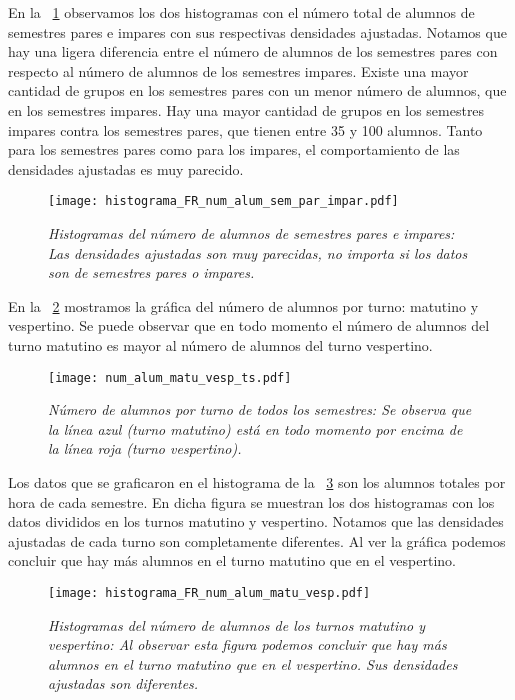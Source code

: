 En la \figurename{~\ref{histNumAlTotal_ParImpar}} observamos los dos histogramas con el número total de alumnos de semestres pares e impares con sus respectivas densidades ajustadas. Notamos que hay una ligera diferencia entre el número de alumnos de los semestres pares con respecto al número de alumnos de los semestres impares. Existe una mayor cantidad de grupos en los semestres pares con un menor número de alumnos, que en los semestres impares. Hay una mayor cantidad de grupos en los semestres impares contra los semestres pares, que tienen entre 35 y 100 alumnos. Tanto para los semestres pares como para los impares, el comportamiento de las densidades ajustadas es muy parecido.

\begin{figure}[H]
\centering
\texttt{[image: histograma\_FR\_num\_alum\_sem\_par\_impar.pdf]} %
\caption[\textit{Histogramas del número de alumnos de semestres pares e impares}]{\textit{Histogramas del número de alumnos de semestres pares e impares: Las densidades ajustadas son muy parecidas, no importa si los datos son de semestres pares o impares.}}\label{histNumAlTotal_ParImpar}
\end{figure}


En la \figurename{~\ref{NumAlTotal_MatuVesp_ts}} mostramos la gráfica del número de alumnos por turno: matutino y vespertino. Se puede observar que en todo momento el número de alumnos del turno matutino es mayor al número de alumnos del turno vespertino.

\begin{figure}[H]
\centering
\texttt{[image: num\_alum\_matu\_vesp\_ts.pdf]} %
\caption[\textit{Número de alumnos por turno de todos los semestres}]{\textit{Número de alumnos por turno de todos los semestres: Se observa que la línea azul (turno matutino) está en todo momento por encima de la línea roja (turno vespertino).}}\label{NumAlTotal_MatuVesp_ts}
\end{figure}

Los datos que se graficaron en el histograma de la \figurename{~\ref{histNumAlTotal_MatuVesp}} son los alumnos totales por hora de cada semestre. En dicha figura se muestran los dos histogramas con los datos divididos en los turnos matutino y vespertino. Notamos que las densidades ajustadas de cada turno son completamente diferentes. Al ver la gráfica podemos concluir que hay más alumnos en el turno matutino que en el vespertino.

\begin{figure}[H]
\centering
\texttt{[image: histograma\_FR\_num\_alum\_matu\_vesp.pdf]} %
\caption[\textit{Histogramas del número de alumnos de los turnos matutino y vespertino}]{\textit{Histogramas del número de alumnos de los turnos matutino y vespertino: Al observar esta figura podemos concluir que hay más alumnos en el turno matutino que en el vespertino. Sus densidades ajustadas son diferentes.}}\label{histNumAlTotal_MatuVesp}
\end{figure}



